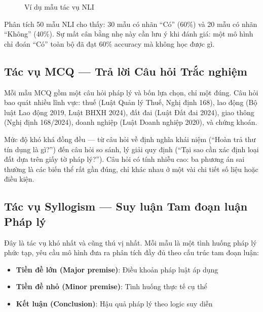 \documentclass[fontsize=13pt,a4paper,oneside,DIV=calc,chapterprefix=true]{scrbook}
\begin{document}
\begin{figure}[H]
\centering
{}
\caption{Ví dụ mẫu tác vụ NLI}
\label{fig:nli_example}
\end{figure}

Phân tích 50 mẫu NLI cho thấy: 30 mẫu có nhãn ``Có'' (60\%) và 20 mẫu có nhãn ``Không'' (40\%).
Sự mất cân bằng nhẹ này cần lưu ý khi đánh giá: một mô hình chỉ đoán ``Có'' toàn bộ đã đạt
60\% accuracy mà không học được gì.

\subsection{Tác vụ MCQ --- Trả lời Câu hỏi Trắc nghiệm}

Mỗi mẫu MCQ gồm một câu hỏi pháp lý và bốn lựa chọn, chỉ một đúng. Câu hỏi bao quát nhiều
lĩnh vực: thuế (Luật Quản lý Thuế, Nghị định 168), lao động (Bộ luật Lao động 2019, Luật BHXH
2024), đất đai (Luật Đất đai 2024), giao thông (Nghị định 168/2024), doanh nghiệp (Luật Doanh
nghiệp 2020), và chứng khoán.

Mức độ khó khá đồng đều --- từ câu hỏi về định nghĩa khái niệm (``Hoàn trả thư tín dụng là
gì?'') đến câu hỏi so sánh, lý giải quy định (``Tại sao cần xác định loại đất dựa trên giấy
tờ pháp lý?''). Câu hỏi có tính nhiễu cao: ba phương án sai thường là các biến thể rất gần
đúng, chỉ khác nhau ở một vài chi tiết số liệu hoặc điều kiện.

\subsection{Tác vụ Syllogism --- Suy luận Tam đoạn luận Pháp lý}

Đây là tác vụ khó nhất và cũng thú vị nhất. Mỗi mẫu là một tình huống pháp lý phức tạp, yêu
cầu mô hình đưa ra phân tích đầy đủ theo cấu trúc tam đoạn luận:
\begin{itemize}
  \item \textbf{Tiền đề lớn (Major premise)}: Điều khoản pháp luật áp dụng
  \item \textbf{Tiền đề nhỏ (Minor premise)}: Tình huống thực tế cụ thể
  \item \textbf{Kết luận (Conclusion)}: Hậu quả pháp lý theo logic suy diễn
\end{itemize}
\end{document}
